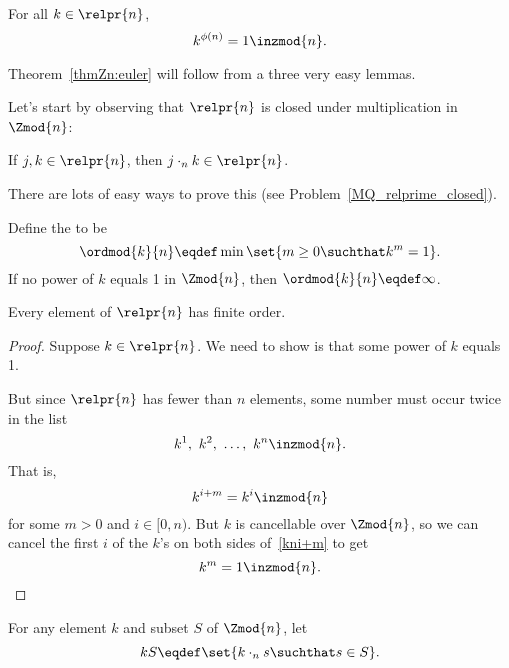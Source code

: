 \begin{theorem}\label{thmZn:euler}
For all $k \in \relpr{n}$,
\begin{equation}\label{eqZn:euler}
    k^{\phi(n)} = 1 \inzmod{n}.
\end{equation}
\end{theorem}

Theorem~\ref{thmZn:euler} will follow from a three very easy lemmas.

Let's start by observing that $\relpr{n}$ is closed under
multiplication in $\Zmod{n}$:
\begin{lemma}\label{relprimgroup}
If $j,k \in \relpr{n}$, then $j \cdot_n k \in \relpr{n}$.
\end{lemma}
There are lots of easy ways to prove this (see
Problem~\ref{MQ_relprime_closed}).

\begin{editingnotes}
\begin{definition}
Define the  to be
\[
\ordmod{k}{n} \eqdef \min \set{m \geq 0 \suchthat k^m = 1}.
\]
If no power of $k$ equals 1 in $\Zmod{n}$, then $\ordmod{k}{n} \eqdef
\infty$.
\end{definition}

\begin{lemma}\label{relprime_order}
Every element of $\relpr{n}$ has finite order.

\begin{proof}
Suppose $k \in \relpr{n}$.  We need to show is that some power of $k$
equals 1.

But since $\relpr{n}$ has fewer than $n$ elements, some number must
occur twice in the list
\[
k^1,\ k^2,\ \dots,\ k^n \inzmod{n}.
\] 
That is,
\begin{equation}\label{kni+m}
k^{i+m} = k^{i} \inzmod{n}
\end{equation}
for some $m >0$ and $i \in [0,n)$.  But $k$ is cancellable over
  $\Zmod{n}$, so we can cancel the first $i$ of the $k$'s on both
  sides of~\eqref{kni+m} to get
\[
k^m =1 \inzmod{n}.
\]
\end{proof}
\end{lemma}
\end{editingnotes}

\begin{definition}\label{def:kS}
For any element $k$ and subset $S$ of $\Zmod{n}$, let
\[
kS \eqdef \set{k \cdot_n s\suchthat s \in S}.
\]
\end{definition}

